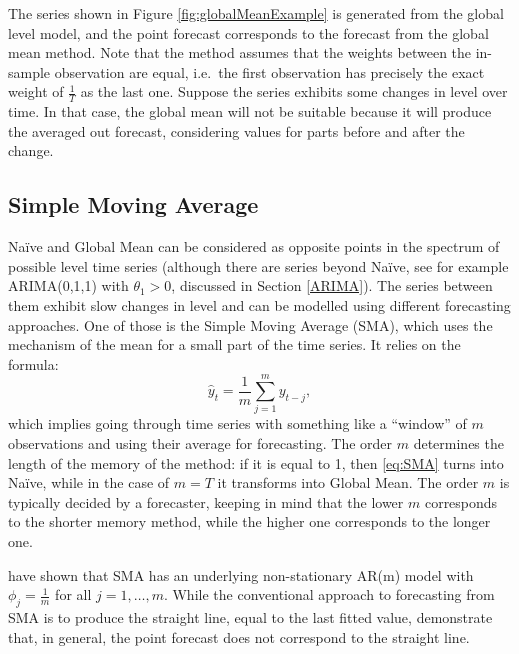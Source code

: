 \documentclass[
]{book}
\theoremstyle{definition}
\theoremstyle{definition}
\theoremstyle{definition}
\theoremstyle{definition}
\theoremstyle{remark}
\begin{document}
The series shown in Figure \ref{fig:globalMeanExample} is generated from the global level model, and the point forecast corresponds to the forecast from the global mean method. Note that the method assumes that the weights between the in-sample observation are equal, i.e.~the first observation has precisely the exact weight of \(\frac{1}{T}\) as the last one. Suppose the series exhibits some changes in level over time. In that case, the global mean will not be suitable because it will produce the averaged out forecast, considering values for parts before and after the change.

\hypertarget{SMA}{%
\subsection{Simple Moving Average}\label{SMA}}

Naïve and Global Mean can be considered as opposite points in the spectrum of possible level time series (although there are series beyond Naïve, see for example ARIMA(0,1,1) with \(\theta_1>0\), discussed in Section \ref{ARIMA}). The series between them exhibit slow changes in level and can be modelled using different forecasting approaches. One of those is the Simple Moving Average (SMA), which uses the mechanism of the mean for a small part of the time series. It relies on the formula:
\begin{equation}
    \hat{y}_t = \frac{1}{m}\sum_{j=1}^{m} y_{t-j},
    \label{eq:SMA}
\end{equation}
which implies going through time series with something like a ``window'' of \(m\) observations and using their average for forecasting. The order \(m\) determines the length of the memory of the method: if it is equal to 1, then \eqref{eq:SMA} turns into Naïve, while in the case of \(m=T\) it transforms into Global Mean. The order \(m\) is typically decided by a forecaster, keeping in mind that the lower \(m\) corresponds to the shorter memory method, while the higher one corresponds to the longer one.

\citet{Svetunkov2017} have shown that SMA has an underlying non-stationary AR(m) model with \(\phi_j=\frac{1}{m}\) for all \(j=1, \dots, m\). While the conventional approach to forecasting from SMA is to produce the straight line, equal to the last fitted value, \citet{Svetunkov2017} demonstrate that, in general, the point forecast does not correspond to the straight line.
\end{document}
